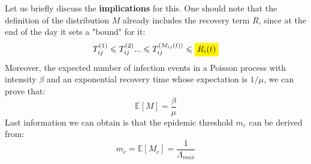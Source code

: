 \documentclass[../main/main.tex]{subfiles}
\begin{document}
Let us briefly discuss the \textbf{implications} for this. One should note that the definition of the distribution $M$ already includes the recovery term $R$, since at the end of the day it sets a "bound" for it:
\begin{equation*}
  T_{ij}^{(1)} \leqslant T_{ij}^{(2)} ... \leqslant T_{ij}^{(M_{ij}(t))} \leqslant \mathcolorbox{yellow}{R_i(t)}
\end{equation*}
Moreover, the expected number of infection events in a Poisson process with intensity $\beta$ and an exponential recovery time whose expectation is $1/\mu$, we can prove that:
\begin{equation*}
    \mathbb{E}[M] = \frac{\beta}{\mu}
\end{equation*}
Last information we can obtain is that the epidemic threshold $m_c$ can be derived from:
\begin{equation*}
    m_c = \mathbb{E}[M_c] = \frac{1}{\Lambda_{max}}
\end{equation*}
\end{document}
